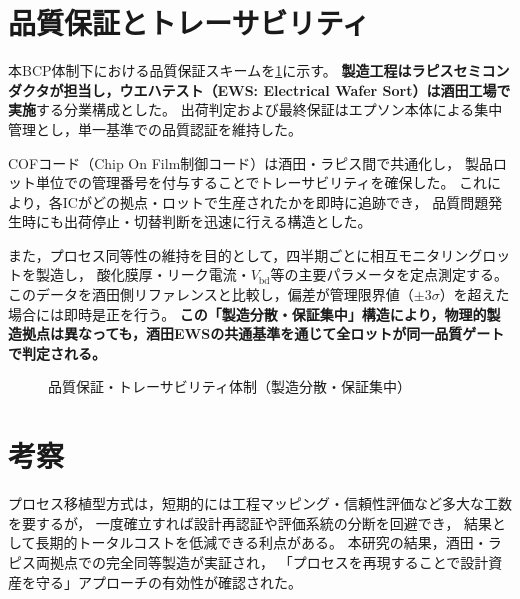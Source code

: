 \documentclass[conference]{IEEEtran}
\begin{document}
\section{品質保証とトレーサビリティ}
本BCP体制下における品質保証スキームを\cref{fig:qa_flow}に示す。
\textbf{製造工程はラピスセミコンダクタが担当し，ウエハテスト（EWS: Electrical Wafer Sort）は酒田工場で実施}する分業構成とした。
出荷判定および最終保証はエプソン本体による集中管理とし，単一基準での品質認証を維持した。

COFコード（Chip On Film制御コード）は酒田・ラピス間で共通化し，
製品ロット単位での管理番号を付与することでトレーサビリティを確保した。
これにより，各ICがどの拠点・ロットで生産されたかを即時に追跡でき，
品質問題発生時にも出荷停止・切替判断を迅速に行える構造とした。

また，プロセス同等性の維持を目的として，四半期ごとに相互モニタリングロットを製造し，
酸化膜厚・リーク電流・$V_{\mathrm{bd}}$等の主要パラメータを定点測定する。
このデータを酒田側リファレンスと比較し，偏差が管理限界値（$\pm3\sigma$）を超えた場合には即時是正を行う。
\textbf{この「製造分散・保証集中」構造により，物理的製造拠点は異なっても，酒田EWSの共通基準を通じて全ロットが同一品質ゲートで判定される。}

\begin{figure}[t]
\centering
{}
\caption{品質保証・トレーサビリティ体制（製造分散・保証集中）}
\label{fig:qa_flow}
\end{figure}

\section{考察}
プロセス移植型方式は，短期的には工程マッピング・信頼性評価など多大な工数を要するが，
一度確立すれば設計再認証や評価系統の分断を回避でき，
結果として長期的トータルコストを低減できる利点がある。
本研究の結果，酒田・ラピス両拠点での完全同等製造が実証され，
「プロセスを再現することで設計資産を守る」アプローチの有効性が確認された。
\end{document}

